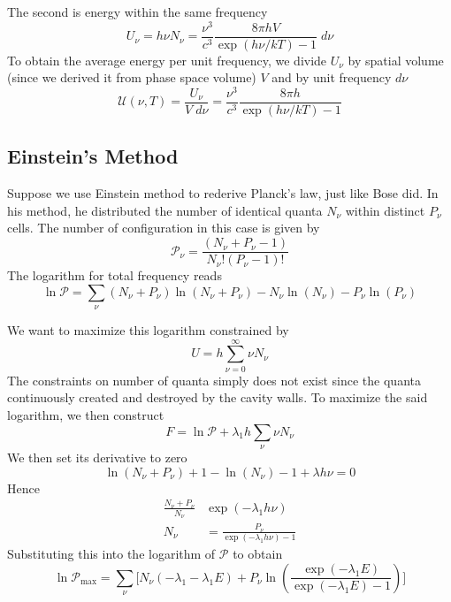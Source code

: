 \documentclass[../../../Main.tex]{subfiles}
\begin{document}
The second is energy within the same frequency
\begin{equation*}
    U_\nu=h\nu N_\nu =\frac{\nu^3}{c^3}\frac{8\pi h V}{\exp(h\nu/k T)-1}\;d\nu
\end{equation*}
To obtain the average energy per unit frequency, we divide $U_\nu$ by spatial volume (since we derived it from phase space volume) $V$ and by unit frequency $d\nu$
\begin{equation*}
    \mathcal{U}(\nu,T)=\frac{U_\nu}{V\;d\nu}=\frac{\nu^3}{c^3}\frac{8\pi h}{\exp(h\nu/k T)-1}
\end{equation*}

\subsection*{Einstein's Method}
Suppose we use Einstein method to rederive Planck's law, just like Bose did. In his method, he distributed the number of identical quanta $N_\nu$ within distinct $P_\nu$ cells. The number of configuration in this case is given by 
\begin{equation*}
    \mathcal{P}_\nu=\frac{(N_\nu+P_\nu-1)}{N_\nu! (P_\nu-1)!}
\end{equation*}
The logarithm for total frequency reads
\begin{equation*}
    \ln \mathcal{P}=\sum_\nu (N_\nu+P_\nu)\ln (N_\nu+P_\nu)-N_\nu\ln(N_\nu)- P_\nu \ln (P_\nu)
\end{equation*}

We want to maximize this logarithm constrained by 
\begin{equation*}
    U=h\sum_{\nu=0}^{\infty} \nu N_\nu
\end{equation*}
The constraints on number of quanta simply does not exist since the quanta continuously created and destroyed by the cavity walls. To maximize the said logarithm, we then construct
\begin{equation*}
    F=\ln \mathcal{P}+\lambda_1h\sum_{\nu} \nu N_\nu
\end{equation*}
We then set its derivative to zero 
\begin{equation*}
    \ln(N_\nu+P_\nu) +1 -\ln(N_\nu) -1 +\lambda h\nu=0
\end{equation*}
Hence
\begin{align*}
    \frac{N_\nu+P_\nu}{N_\nu}&\exp(-\lambda_1h\nu)\\
    N_\nu&=\frac{P_\nu}{\exp(-\lambda_1 h\nu)-1}
\end{align*}
Substituting this into the logarithm of $\mathcal{P}$ to obtain
\begin{equation*}
    \ln \mathcal{P}_{\max}=\sum_\nu \Bigg[N_\nu \left(-\lambda_1-\lambda_1 E\right)
    + P_\nu\ln\left(\frac{\exp(-\lambda_1E)}{\exp(-\lambda_1E)-1}\right)\Bigg]
\end{equation*}
\end{document}
